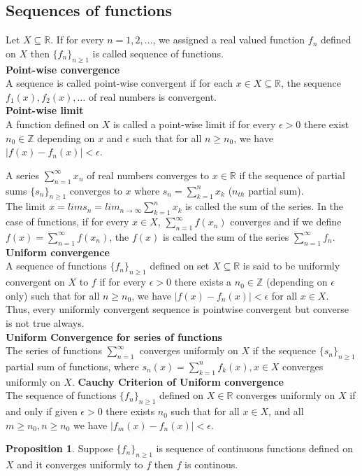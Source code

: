 \documentclass[12pt]{report}
\theoremstyle{definition}
\newtheorem{prop}{Proposition}
\begin{document}
\subsection*{Sequences of functions}
Let $X \subseteq \mathbb{R}$. If for every $n = 1,2, \dots$, we assigned a real valued function $f_n$ defined on $X$ then $\{f_n\}_{n \geq 1}$ is called sequence of  functions.\\
\textbf{Point-wise convergence}\\
A sequence is called point-wise convergent if for each $x \in X \subseteq \mathbb{R}$, the sequence $f_1(x), f_2(x), \dots$ of real numbers is convergent. \\
\textbf{Point-wise limit} \\
A function defined on $X$ is called a point-wise limit if for every $\epsilon > 0$ there exist $n_0 \in \mathbb{Z}$ depending on $x$ and $\epsilon$ such that for all $n \geq n_0$, we have $|f(x) - f_n(x)| < \epsilon$.

A series $\sum\limits_{n = 1}^{\infty} x_n$ of real numbers converges to $x \in \mathbb{R}$ if the sequence of partial sums $\{s_n\}_{n\geq 1}$ converges to $x$ where $s_n = \sum\limits_{k = 1}^n x_k$ ($n_{th}$ partial sum).\\
The limit $x = lims_n = lim_{n \to \infty}\sum\limits_{k = 1}^n x_k$ is called the sum of the series. In the case of functions, if for every $x \in X$, $\sum\limits_{n = 1}^{\infty} f(x_n)$ converges and if we define $f(x) = \sum\limits_{n = 1}^{\infty} f(x_n)$, the $f(x)$ is called the sum of the series $\sum\limits_{n = 1}^{\infty} f_n$.\\
\textbf{Uniform convergence}\\
A sequence of functions $\{f_n\}_{n \geq 1}$ defined on set $X \subseteq \mathbb{R}$ is said to be uniformly convergent on $X$ to $f$ if for every $\epsilon > 0$ there exists a $n_0 \in \mathbb{Z}$ (depending on $\epsilon$ only) such that for all $n \geq n_0$, we have $|f(x) - f_n(x)| < \epsilon$ for all $x \in X$.\\
Thus, every uniformly convergent sequence is pointwise convergent but converse is not true always.\\
\textbf{Uniform Convergence for series of functions}\\
The series of functions $\sum\limits_{n=1}^{\infty}$ converges uniformly on $X$ if the sequence $\{s_n\}_{n \geq 1}$ partial sum of functions, where $s_n(x) = \sum\limits_{k=1}^n f_k(x), x \in X$ converges uniformly on $X$.
\textbf{Cauchy Criterion of Uniform convergence}\\
The sequence of functions $\{f_n\}_{n\geq 1}$ defined on $X \in \mathbb{R}$ converges uniformly on $X$ if and only if given $\epsilon > 0$ there exists $n_0$ such that for all $x \in X$, and all $m \geq n_0,n\geq n_0$ we have $|f_m(x) -f_n(x)| < \epsilon$.
\begin{prop}
    Suppose $\{f_n\}_{n\geq 1}$ is sequence of continuous functions defined on $X$ and it converges uniformly to $f$ then $f$ is continous.
\end{prop}
\end{document}
